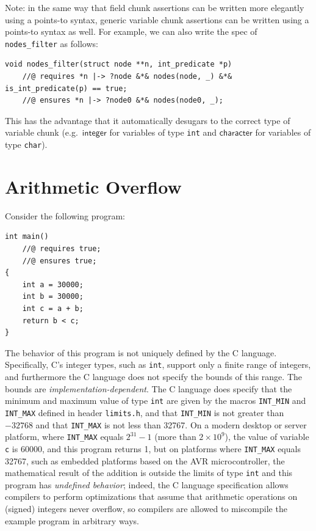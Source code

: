 \documentclass{article}
\begin{document}
Note: in the same way that field chunk assertions can be written more elegantly using a points-to syntax, generic variable chunk assertions can be written using a points-to syntax as well. For example, we can also write the spec of \lstinline!nodes_filter! as follows:
\begin{lstlisting}
void nodes_filter(struct node **n, int_predicate *p)
    //@ requires *n |-> ?node &*& nodes(node, _) &*& is_int_predicate(p) == true;
    //@ ensures *n |-> ?node0 &*& nodes(node0, _);
\end{lstlisting}

This has the advantage that it automatically desugars to the correct type of variable chunk (e.g.~$\mathsf{integer}$ for variables of type \verb!int! and $\mathsf{character}$ for variables of type \verb!char!).

\section{Arithmetic Overflow}

Consider the following program:
\begin{lstlisting}
int main()
    //@ requires true;
    //@ ensures true;
{
    int a = 30000;
    int b = 30000;
    int c = a + b;
    return b < c;
}
\end{lstlisting}
The behavior of this program is not uniquely defined by the C
language. Specifically, C's integer types, such as \lstinline!int!, support only
a finite range of integers, and furthermore the C language does
not specify the bounds of this range. The bounds are
\emph{implementation-dependent}. The C language does specify
that the minimum and maximum value of type \lstinline!int! are
given by the macros \lstinline!INT_MIN! and \lstinline!INT_MAX! defined in header \verb|limits.h|, and that \lstinline!INT_MIN!
is not greater than $-32768$ and that \lstinline|INT_MAX| is not less than 32767. On a modern desktop or server platform, where \lstinline|INT_MAX| equals $2^{31}-1$ (more than $2\times10^9$), the value of variable \lstinline|c| is 60000, and this program returns 1, but on platforms where \lstinline|INT_MAX| equals 32767, such as embedded platforms based on the AVR microcontroller, the mathematical result of the addition is outside the limits of type \lstinline|int| and this program has \emph{undefined behavior}; indeed, the C language specification allows compilers to perform optimizations that assume that arithmetic operations on (signed) integers never overflow, so compilers are allowed to miscompile the example program in arbitrary ways.
\end{document}
